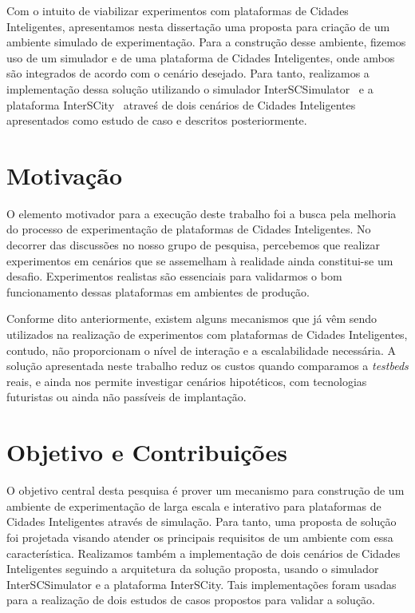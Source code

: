 Com o intuito de viabilizar experimentos com plataformas de Cidades Inteligentes, apresentamos nesta dissertação uma proposta para criação de um ambiente simulado de experimentação.
Para a construção desse ambiente, fizemos uso de um simulador e de uma plataforma de Cidades Inteligentes, onde ambos são integrados de acordo com o cenário desejado.
Para tanto, realizamos a implementação dessa solução utilizando o simulador InterSCSimulator~\citep{santana_17} e a plataforma InterSCity~\citep{arthur_17} atraveś de dois cenários de Cidades Inteligentes
apresentados como estudo de caso e descritos posteriormente.

\section{Motivação}

O elemento motivador para a execução deste trabalho foi a busca pela melhoria do processo de experimentação de plataformas de Cidades Inteligentes.
No decorrer das discussões no nosso grupo de pesquisa, percebemos que realizar experimentos em cenários que se assemelham à realidade ainda constitui-se um desafio.
Experimentos realistas são essenciais para validarmos o bom funcionamento dessas plataformas em ambientes de produção.

Conforme dito anteriormente, existem alguns mecanismos que já vêm sendo utilizados na realização de experimentos com plataformas de Cidades Inteligentes, contudo, não proporcionam o nível de interação
e a escalabilidade necessária.
A solução apresentada neste trabalho reduz os custos quando comparamos a \textit{testbeds} reais, e ainda nos permite investigar cenários hipotéticos, com tecnologias futuristas ou ainda não
passíveis de implantação.

\section{Objetivo e Contribuições}

O objetivo central desta pesquisa é prover um mecanismo para construção de um ambiente de experimentação de larga escala e interativo para plataformas de Cidades Inteligentes através de simulação.
Para tanto, uma proposta de solução foi projetada visando atender os principais requisitos de um ambiente com essa característica.
Realizamos também a implementação de dois cenários de Cidades Inteligentes seguindo a arquitetura da solução proposta, usando o simulador InterSCSimulator e a plataforma InterSCity.
Tais implementações foram usadas para a realização de dois estudos de casos propostos para validar a solução.

